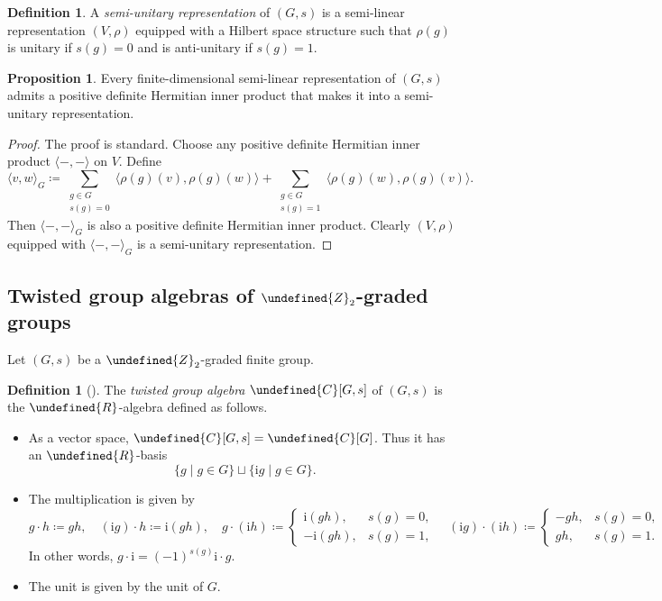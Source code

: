 \documentclass[10pt]{article}
\let\mathbb\undefined
\theoremstyle{definition}
\newtheorem{prop}[thm]{Proposition}
\newtheorem{defn}[thm]{Definition}
\numberwithin{equation}{section}
\numberwithin{thm}{section}
\newcommand{\bit}{\begin{itemize}}
\newcommand{\eit}{\end{itemize}}
\newcommand{\pf}{\begin{proof}}
\newcommand{\epf}{\end{proof}}
\newcommand{\mynote}[2][red]{{\color{#1} \scriptsize #2}}
\newcommand{\Cb}{\mathbb{C}}
\newcommand{\Rb}{\mathbb{R}}
\newcommand{\Zb}{\mathbb{Z}}
\newcommand{\rmB}{\mathrm{B}}
\newcommand{\vect}{\mathrm{Vec}}
\newcommand{\rep}{\mathrm{Rep}}
\newcommand{\srep}{\mathrm{sRep}}
\newcommand{\Pic}{\mathrm{Pic}}
\begin{document}

\begin{defn}
A \emph{semi-unitary representation} of $(G,s)$ is a semi-linear representation $(V,\rho)$ equipped with a Hilbert space structure such that $\rho(g)$ is unitary if $s(g) = 0$ and is anti-unitary if $s(g) = 1$.
\end{defn}

\begin{prop}
Every finite-dimensional semi-linear representation of $(G,s)$ admits a positive definite Hermitian inner product that makes it into a semi-unitary representation.
\end{prop}

\pf
The proof is standard. Choose any positive definite Hermitian inner product $\langle -,- \rangle$ on $V$. Define
\[
\langle v,w \rangle_G \coloneqq \sum_{\substack{g \in G\\s(g) = 0}} \langle \rho(g)(v),\rho(g)(w) \rangle + \sum_{\substack{g \in G\\s(g) = 1}} \langle \rho(g)(w),\rho(g)(v) \rangle .
\]
Then $\langle -,- \rangle_G$ is also a positive definite Hermitian inner product. Clearly $(V,\rho)$ equipped with $\langle -,- \rangle_G$ is a semi-unitary representation.
\epf

\subsection{Twisted group algebras of \texorpdfstring{$\Zb_2$}{Z2}-graded groups}

Let $(G,s)$ be a $\Zb_2$-graded finite group.

\begin{defn}[]
The \emph{twisted group algebra} $\Cb[G,s]$ of $(G,s)$ is the $\Rb$-algebra defined as follows.
\bit
\item As a vector space, $\Cb[G,s] = \Cb[G]$. Thus it has an $\Rb$-basis
\[
\{g \mid g \in G\} \sqcup \{\mathrm i g \mid g \in G \} .
\]
\item The multiplication is given by
\[
g \cdot h \coloneqq gh , \quad (\mathrm i g) \cdot h \coloneqq \mathrm i (gh) , \quad g \cdot (\mathrm i h) \coloneqq \begin{cases}
\mathrm i (gh) , & s(g) = 0 , \\
-\mathrm i (gh) , & s(g) = 1 ,
\end{cases} \quad
(\mathrm i g) \cdot (\mathrm i h) \coloneqq \begin{cases}
- gh , & s(g) = 0 , \\
gh , & s(g) = 1 .
\end{cases}
\]
In other words, $g \cdot \mathrm i = (-1)^{s(g)} \mathrm i \cdot g$.
\item The unit is given by the unit of $G$.
\eit
\end{defn}
\end{document}
